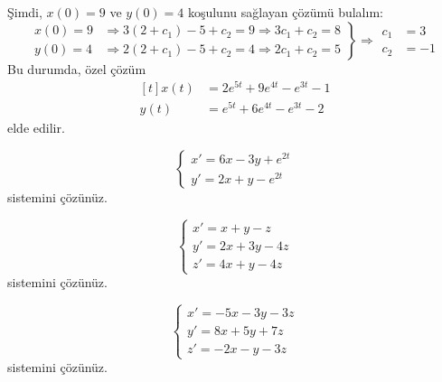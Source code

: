 \documentclass[11pt,a4paper]{article}
\begin{document}
\begin{cozum}
Şimdi, $x(0)=9$ ve $y(0)=4$ koşulunu sağlayan çözümü bulalım:
\[
\left.\begin{aligned}
x(0)=9 &\Rightarrow 3(2+c_1) - 5 + c_2 = 9 \Rightarrow 3c_1 + c_2 = 8 \\
y(0)=4 &\Rightarrow 2(2+c_1) - 5 + c_2 = 4 \Rightarrow 2c_1 + c_2 = 5
\end{aligned}\right\} \Rightarrow \begin{aligned} c_1 &= 3 \\ c_2 &= -1 \end{aligned}
\]
Bu durumda, özel çözüm
\[
\begin{aligned}[t] x(t) &= 2e^{5t} + 9e^{4t} - e^{3t} - 1 \\ y(t) &= e^{5t} + 6e^{4t} - e^{3t} - 2 \end{aligned}
\]
elde edilir.
\end{cozum}

\begin{ornek}[(ÖDEV 1)]
\[
\begin{cases} x' = 6x - 3y + e^{2t} \\ y' = 2x + y - e^{2t} \end{cases}
\]
sistemini çözünüz.
\end{ornek}

\begin{ornek}[(ÖDEV 2)]
\[
\begin{cases} x' = x + y - z \\ y' = 2x + 3y - 4z \\ z' = 4x + y - 4z \end{cases}
\]
sistemini çözünüz.
\end{ornek}

\begin{ornek}[(ÖDEV 3)]
\[
\begin{cases} x' = -5x - 3y - 3z \\ y' = 8x + 5y + 7z \\ z' = -2x - y - 3z \end{cases}
\]
sistemini çözünüz.
\end{ornek}
\end{document}
